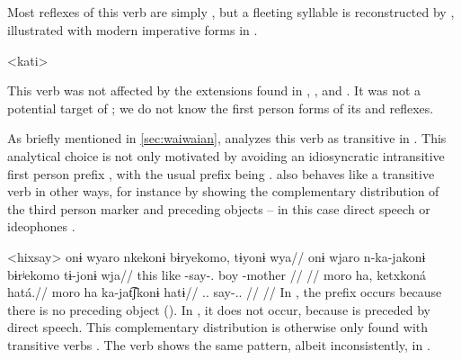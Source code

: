 \subsection{ }
\label{sec:say}
Most reflexes of this verb are simply , but a fleeting syllable  is reconstructed by \textcite{gildea2007greenberg}, illustrated with modern imperative forms in .

\pex<kati> \PC {} 
\a \apalai {} \parencite[35]{koehn1986apalai}
\a \wayana {} \parencite[181]{wayanatavares2005}
\a \hixka {} \parencite[128]{hixkaryanaderby1985}
\a \panare {} \parencite[102]{mattei1994diccionario}
\xe

This verb was not affected by the extensions found in \PPek, \PWai, and \PTir.
It was not a potential target of \akuriyo {}; we do not know the first person forms of its \carijo and \yukpa reflexes.

As briefly mentioned in \cref{sec:waiwaian}, \textcite{hixkaryanaderby1985} analyzes this verb as transitive in \hixka.
This analytical choice is not only motivated by avoiding an idiosyncratic intransitive first person prefix , with the usual prefix being .
\hixka {} also behaves like a transitive verb in other ways, for instance by showing the complementary distribution of the third person marker  and preceding objects -- in this case direct speech or ideophones .

\pex<hixsay>\hixka
{}
\begingl
\glpreamble onɨ wyaro nkekonɨ bɨryekomo, tɨyonɨ wya//
\gla onɨ wjaro n-ka-jakonɨ bɨrʲekomo tɨ-jonɨ wja//
\glb this like -say-. boy -mother //
\glft {} \parencite[][36]{hixkaryanaderby1985}//
\endgl
{}
\begingl
\glpreamble moro ha, ketxkoná hatá.//
\gla moro ha ka-jat͡ʃkonɨ hatɨ//
\glb {}..  say-.. //
\glft {} \parencite[][14]{derbyshire1965textos}//
\endgl
\xe
In , the prefix  occurs because there is no preceding object ().
In , it does not occur, because  is preceded by direct speech.
This complementary distribution is otherwise only found with transitive verbs \parencite[59--60]{gildea1998}.
The verb shows the same pattern, albeit inconsistently, in \trio \parencite[267]{triocarlin2004}.

